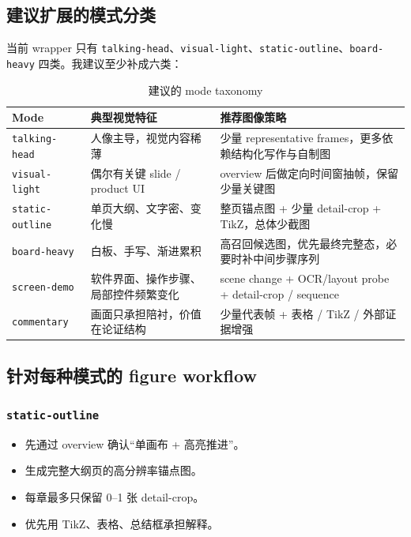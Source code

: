 \documentclass[a4paper]{article}
\begin{document}
\subsection{建议扩展的模式分类}

当前 wrapper 只有 \texttt{talking-head}、\texttt{visual-light}、\texttt{static-outline}、\texttt{board-heavy} 四类。我建议至少补成六类：

\begin{table}[H]
\centering
\caption{建议的 mode taxonomy}
{\small
\begin{tabularx}{\textwidth}{p{2.7cm}p{2.9cm}Y}
\toprule
Mode & 典型视觉特征 & 推荐图像策略 \\
\midrule
\texttt{talking-head} & 人像主导，视觉内容稀薄 & 少量 representative frames，更多依赖结构化写作与自制图 \\
\texttt{visual-light} & 偶尔有关键 slide / product UI & overview 后做定向时间窗抽帧，保留少量关键图 \\
\texttt{static-outline} & 单页大纲、文字密、变化慢 & 整页锚点图 + 少量 detail-crop + TikZ，总体少截图 \\
\texttt{board-heavy} & 白板、手写、渐进累积 & 高召回候选图，优先最终完整态，必要时补中间步骤序列 \\
\texttt{screen-demo} & 软件界面、操作步骤、局部控件频繁变化 & scene change + OCR/layout probe + detail-crop / sequence \\
\texttt{commentary} & 画面只承担陪衬，价值在论证结构 & 少量代表帧 + 表格 / TikZ / 外部证据增强 \\
\bottomrule
\end{tabularx}
}
\end{table}

\subsection{针对每种模式的 figure workflow}

\subsubsection{\texttt{static-outline}}

\begin{itemize}
\item 先通过 overview 确认“单画布 + 高亮推进”。
\item 生成完整大纲页的高分辨率锚点图。
\item 每章最多只保留 0--1 张 detail-crop。
\item 优先用 TikZ、表格、总结框承担解释。
\end{itemize}
\end{document}
